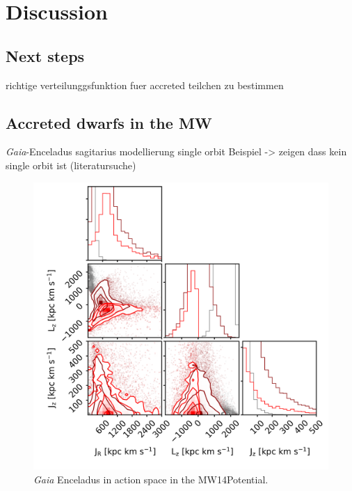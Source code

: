 \section{Discussion}
\subsection{Next steps}
richtige verteilunggsfunktion fuer accreted teilchen zu bestimmen 

\subsection{Accreted dwarfs in the MW}
\textit{Gaia}-Enceladus \cite{Enceladus....Helmi...2018}
sagitarius modellierung single orbit Beispiel
-> zeigen dass kein single orbit ist (literatursuche)

\begin{figure}[htbp]
    \centering
    \includegraphics[width=1.0\textwidth]{plots/Discussion/Gaia_all_actions_MW14_talk3.png}
    \caption{\textit{Gaia} Enceladus in action space in the MW14Potential.}
    \label{fig:act_both_merg_best_pot}
\end{figure}

